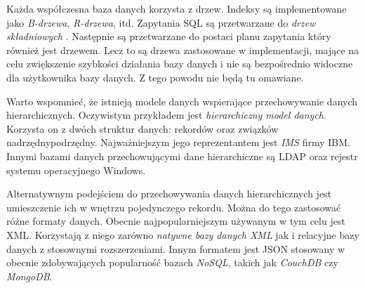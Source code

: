Każda współczesna baza danych korzysta z drzew. 
Indeksy są implementowane jako \emph{B-drzewa}, \emph{R-drzewa}, itd.
Zapytania SQL są przetwarzane do \emph{drzew składniowych} . Następnie są przetwarzane do postaci planu zapytania który również jest drzewem.
Lecz to są drzewa zastosowane w implementacji, mające na celu zwiększenie szybkości działania bazy danych i nie są bezpośrednio widoczne dla użytkownika bazy danych.
Z tego powodu nie będą tu omawiane.

Warto wspomnieć, że istnieją modele danych wspierające przechowywanie danych hierarchicznych.
Oczywistym przykładem jest \emph{hierarchiczny model danych}.
Korzysta on z dwóch struktur danych: rekordów oraz związków nadrzędny\dywiz{}podrzędny.
Najważniejszym jego reprezentantem jest \emph{IMS}  firmy IBM.
Innymi bazami danych przechowującymi dane hierarchiczne są LDAP  oraz rejestr systemu operacyjnego Windows.

Alternatywnym podejściem do przechowywania danych hierarchicznych jest umieszczenie ich w wnętrzu pojedynczego rekordu.
Można do tego zastosować różne formaty danych.
Obecnie najpopularniejszym używanym w tym celu jest XML.
Korzystają z niego zarówno \emph{natywne bazy danych XML}  jak i relacyjne bazy danych z stosownymi rozszerzeniami.
Innym formatem jest JSON stosowany w obecnie zdobywających popularność bazach \emph{NoSQL}, takich jak \emph{CouchDB} czy \emph{MongoDB}. 






%












